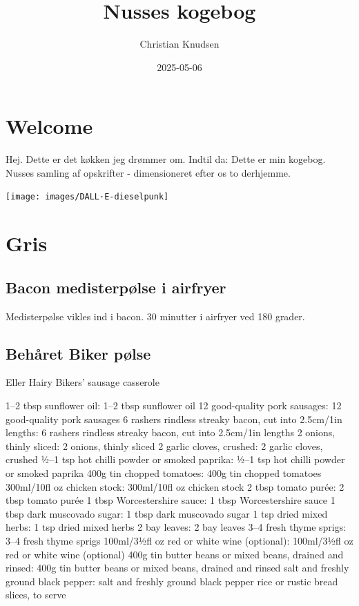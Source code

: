 \documentclass[
]{book}
\title{Nusses kogebog}
\author{Christian Knudsen}
\date{2025-05-06}
\begin{document}
\maketitle

{
\setcounter{tocdepth}{1}
\tableofcontents
}
\chapter{Welcome}\label{welcome}

Hej. Dette er det køkken jeg drømmer om. Indtil da:
Dette er min kogebog. Nusses samling af opskrifter - dimensioneret efter os to derhjemme.

\texttt{[image: images/DALL·E-dieselpunk]}

\chapter{Gris}\label{gris}

\section{Bacon medisterpølse i airfryer}\label{bacon-medisterpuxf8lse-i-airfryer}

Medisterpølse vikles ind i bacon.
30 minutter i airfryer ved 180 grader.

\section{Behåret Biker pølse}\label{behuxe5ret-biker-puxf8lse}

Eller Hairy Bikers' sausage casserole

1--2 tbsp sunflower oil: 1--2 tbsp sunflower oil
12 good-quality pork sausages: 12 good-quality pork sausages
6 rashers rindless streaky bacon, cut into 2.5cm/1in lengths: 6 rashers rindless streaky bacon, cut into 2.5cm/1in lengths
2 onions, thinly sliced: 2 onions, thinly sliced
2 garlic cloves, crushed: 2 garlic cloves, crushed
½--1 tsp hot chilli powder or smoked paprika: ½--1 tsp hot chilli powder or smoked paprika
400g tin chopped tomatoes: 400g tin chopped tomatoes
300ml/10fl oz chicken stock: 300ml/10fl oz chicken stock
2 tbsp tomato purée: 2 tbsp tomato purée
1 tbsp Worcestershire sauce: 1 tbsp Worcestershire sauce
1 tbsp dark muscovado sugar: 1 tbsp dark muscovado sugar
1 tsp dried mixed herbs: 1 tsp dried mixed herbs
2 bay leaves: 2 bay leaves
3--4 fresh thyme sprigs: 3--4 fresh thyme sprigs
100ml/3½fl oz red or white wine (optional): 100ml/3½fl oz red or white wine (optional)
400g tin butter beans or mixed beans, drained and rinsed: 400g tin butter beans or mixed beans, drained and rinsed
salt and freshly ground black pepper: salt and freshly ground black pepper
rice or rustic bread slices, to serve
\end{document}
